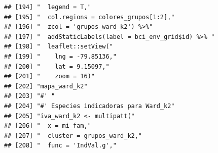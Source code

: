 \documentclass[11pt,]{article}
\begin{document}
\begin{verbatim}
## [194] "  legend = T,"                                                                                                                                                         
## [195] "  col.regions = colores_grupos[1:2],"                                                                                                                                  
## [196] "  zcol = 'grupos_ward_k2') %>%"                                                                                                                                        
## [197] "  addStaticLabels(label = bci_env_grid$id) %>% "                                                                                                                       
## [198] "  leaflet::setView("                                                                                                                                                   
## [199] "    lng = -79.85136,"                                                                                                                                                  
## [200] "    lat = 9.15097,"                                                                                                                                                    
## [201] "    zoom = 16)"                                                                                                                                                        
## [202] "mapa_ward_k2"                                                                                                                                                          
## [203] "#' "                                                                                                                                                                   
## [204] "#' Especies indicadoras para Ward_k2"                                                                                                                                  
## [205] "iva_ward_k2 <- multipatt("                                                                                                                                             
## [206] "  x = mi_fam,"                                                                                                                                                         
## [207] "  cluster = grupos_ward_k2,"                                                                                                                                           
## [208] "  func = 'IndVal.g',"                                                                                                                                                  

\end{verbatim}
\end{document}
